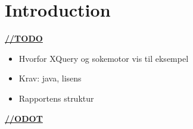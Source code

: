 \chapter{Introduction}
\underline{\textbf{\LARGE //TODO}}

\begin{itemize}
\item Hvorfor XQuery og sokemotor vis til eksempel
\item Krav: java, lisens
\item Rapportens struktur
\end{itemize}

\underline{\textbf{\LARGE //ODOT}}